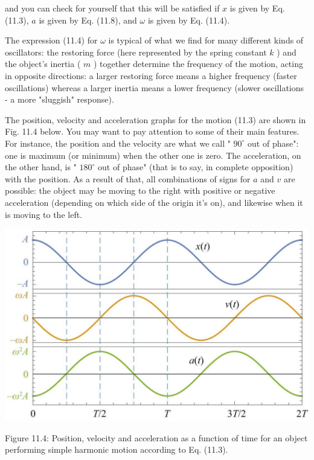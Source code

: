 \documentclass[10pt]{article}
\begin{document}
and you can check for yourself that this will be satisfied if $x$ is given by Eq. (11.3), $a$ is given by Eq. (11.8), and $\omega$ is given by Eq. (11.4).

The expression (11.4) for $\omega$ is typical of what we find for many different kinds of oscillators: the restoring force (here represented by the spring constant $k$ ) and the object's inertia ( $m$ ) together determine the frequency of the motion, acting in opposite directions: a larger restoring force means a higher frequency (faster oscillations) whereas a larger inertia means a lower frequency (slower oscillations - a more "sluggish" response).

The position, velocity and acceleration graphs for the motion (11.3) are shown in Fig. 11.4 below. You may want to pay attention to some of their main features. For instance, the position and the velocity are what we call " $90^{\circ}$ out of phase": one is maximum (or minimum) when the other one is zero. The acceleration, on the other hand, is " $180^{\circ}$ out of phase" (that is to say, in complete opposition) with the position. As a result of that, all combinations of signs for $a$ and $v$ are possible: the object may be moving to the right with positive or negative acceleration (depending on which side of the origin it's on), and likewise when it is moving to the left.

\begin{center}
\includegraphics[max width=\textwidth]{2024_09_14_9969b06773f10b6936e8g-276}
\end{center}

Figure 11.4: Position, velocity and acceleration as a function of time for an object performing simple harmonic motion according to Eq. (11.3).
\end{document}
